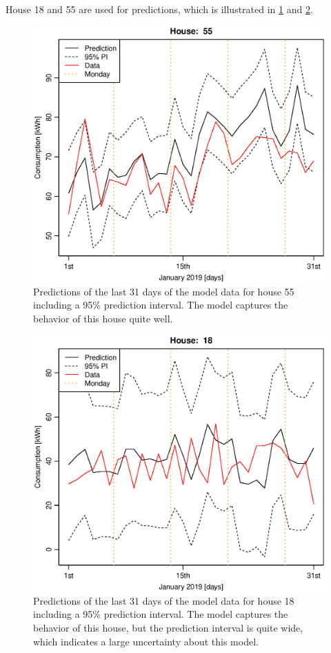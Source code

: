 \noindent House 18 and 55 are used for predictions, which is illustrated in \cref{fig: lmpred_55L} and \cref{fig: lmpred_18L}.
\begin{figure}
    \centering
    \includegraphics[scale=0.55]{../../../figures/lmpred_55L.eps}
    \caption{Predictions of the last 31 days of the model data for house 55 including a 95\% prediction interval. The model captures the behavior of this house quite well.}
    \label{fig: lmpred_55L}
\end{figure}
\begin{figure}
    \centering
    \includegraphics[scale=0.55]{../../../figures/lmpred_18L.eps}
    \caption{Predictions of the last 31 days of the model data for house 18 including a 95\% prediction interval. The model captures the behavior of this house, but the prediction interval is quite wide, which indicates a large uncertainty about this model.}
    \label{fig: lmpred_18L}
\end{figure}

